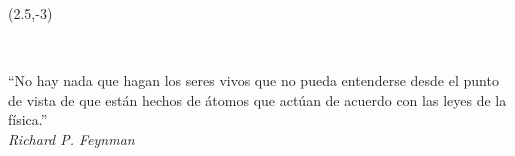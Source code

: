 \begin{textblock}{9}(2.5,-3)
\begin{flushright}
\setlength{\baselineskip}{15pt}
~

``No hay nada que hagan los seres vivos que no pueda entenderse desde el punto de vista de que están hechos de átomos que actúan de acuerdo con las leyes de la física.''\\[.5cm]
\textit{Richard P. Feynman}
\end{flushright}
\end{textblock}




